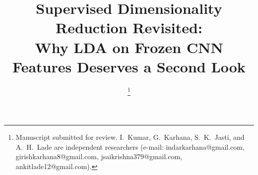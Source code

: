 \documentclass[journal]{IEEEtran}
\begin{document}
\title{Supervised Dimensionality Reduction Revisited:\\Why LDA on Frozen CNN Features Deserves a Second Look}

\author{
\thanks{Manuscript submitted for review. I.~Kumar, G.~Karhana, S.~K.~Jasti, and A.~H.~Lade are independent researchers (e-mail: indarkarhana@gmail.com, girishkarhana8@gmail.com, jsaikrishna379@gmail.com, ankitlade12@gmail.com).}
}

\maketitle











\end{document}

